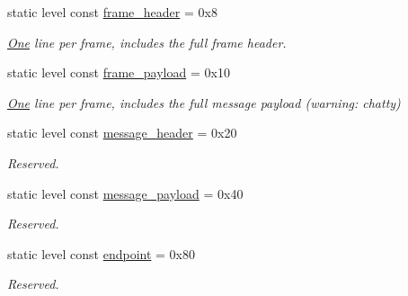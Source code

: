 \begin{DoxyCompactItemize}
static level const \mbox{\hyperlink{structwebsocketpp_1_1log_1_1alevel_ac25fc7cb5fc229abb6fc893f16ffb678}{frame\+\_\+header}} = 0x8
\begin{DoxyCompactList}\small\item\em \mbox{\hyperlink{struct_one}{One}} line per frame, includes the full frame header. \end{DoxyCompactList}\item 
\mbox{\label{structwebsocketpp_1_1log_1_1alevel_aa38cfdf7a82f33cac319438462707e90}} 
static level const \mbox{\hyperlink{structwebsocketpp_1_1log_1_1alevel_aa38cfdf7a82f33cac319438462707e90}{frame\+\_\+payload}} = 0x10
\begin{DoxyCompactList}\small\item\em \mbox{\hyperlink{struct_one}{One}} line per frame, includes the full message payload (warning\+: chatty) \end{DoxyCompactList}\item 
\mbox{\label{structwebsocketpp_1_1log_1_1alevel_ae05d0972bc4d68cca49faf8c82d40304}} 
static level const \mbox{\hyperlink{structwebsocketpp_1_1log_1_1alevel_ae05d0972bc4d68cca49faf8c82d40304}{message\+\_\+header}} = 0x20
\begin{DoxyCompactList}\small\item\em Reserved. \end{DoxyCompactList}\item 
\mbox{\label{structwebsocketpp_1_1log_1_1alevel_ace7d9b9c9ed82029ec93c4f45081b7ac}} 
static level const \mbox{\hyperlink{structwebsocketpp_1_1log_1_1alevel_ace7d9b9c9ed82029ec93c4f45081b7ac}{message\+\_\+payload}} = 0x40
\begin{DoxyCompactList}\small\item\em Reserved. \end{DoxyCompactList}\item 
\mbox{\label{structwebsocketpp_1_1log_1_1alevel_ad35433a6b8793f2bd1f5595386a09c73}} 
static level const \mbox{\hyperlink{structwebsocketpp_1_1log_1_1alevel_ad35433a6b8793f2bd1f5595386a09c73}{endpoint}} = 0x80
\begin{DoxyCompactList}\small\item\em Reserved. \end{DoxyCompactList}\item 

\end{DoxyCompactItemize}
